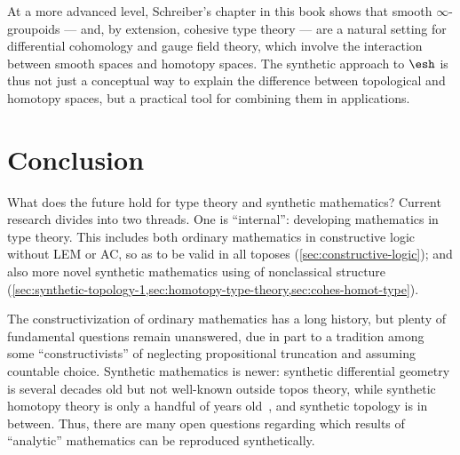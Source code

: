 \documentclass[12pt]{article}
\def\oo{\ensuremath{\infty}}
\numberwithin{equation}{section}
\newcommand{\shape}{\ensuremath{\mathord{\raisebox{0.5pt}{\text{\rm\esh}}}}}
\begin{document}
At a more advanced level, Schreiber's chapter in this book shows that smooth \oo-groupoids --- and, by extension, cohesive type theory --- are a natural setting for differential cohomology and gauge field theory, which involve the interaction between smooth spaces and homotopy spaces.
The synthetic approach to $\shape$ is thus not just a conceptual way to explain the difference between topological and homotopy spaces, but a practical tool for combining them in applications.


\section{Conclusion}
\label{sec:conclusion}

What does the future hold for type theory and synthetic mathematics?
Current research divides into two threads.
One is ``internal'': developing mathematics in type theory.
This includes both ordinary mathematics in constructive logic without LEM or AC, so as to be valid in all toposes (\cref{sec:constructive-logic}); and also more novel synthetic mathematics using of nonclassical structure (\cref{sec:synthetic-topology-1,sec:homotopy-type-theory,sec:cohes-homot-type}).

The constructivization of ordinary mathematics has a long history, but plenty of fundamental questions remain unanswered, due in part to a tradition among some ``constructivists'' of neglecting propositional truncation and assuming countable choice.
Synthetic mathematics is newer: synthetic differential geometry is several decades old but not well-known outside topos theory, while synthetic homotopy theory is only a handful of years old~\cite{ls:pi1s1,hottbook}, and synthetic topology is in between.
Thus, there are many open questions regarding which results of ``analytic'' mathematics can be reproduced synthetically.

\end{document}
